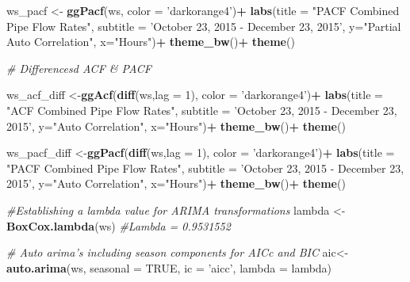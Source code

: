 \documentclass[openany]{book}
\newenvironment{Shaded}{\begin{snugshade}}{\end{snugshade}}
\newcommand{\CommentTok}[1]{\textcolor[rgb]{0.56,0.35,0.01}{\textit{#1}}}
\newcommand{\DataTypeTok}[1]{\textcolor[rgb]{0.13,0.29,0.53}{#1}}
\newcommand{\DecValTok}[1]{\textcolor[rgb]{0.00,0.00,0.81}{#1}}
\newcommand{\KeywordTok}[1]{\textcolor[rgb]{0.13,0.29,0.53}{\textbf{#1}}}
\newcommand{\NormalTok}[1]{#1}
\newcommand{\OperatorTok}[1]{\textcolor[rgb]{0.81,0.36,0.00}{\textbf{#1}}}
\newcommand{\OtherTok}[1]{\textcolor[rgb]{0.56,0.35,0.01}{#1}}
\newcommand{\StringTok}[1]{\textcolor[rgb]{0.31,0.60,0.02}{#1}}
\begin{document}
\begin{Shaded}
\begin{Highlighting}[]
{{{{{{{{{{{\NormalTok{ws_pacf <-}\StringTok{ }\KeywordTok{ggPacf}\NormalTok{(ws, }\DataTypeTok{color =} \StringTok{'darkorange4'}\NormalTok{)}\OperatorTok{+}
\StringTok{    }\KeywordTok{labs}\NormalTok{(}\DataTypeTok{title =} \StringTok{"PACF Combined Pipe Flow Rates"}\NormalTok{, }
         \DataTypeTok{subtitle =} \StringTok{'October 23, 2015 - December 23, 2015'}\NormalTok{,}
         \DataTypeTok{y=}\StringTok{"Partial Auto Correlation"}\NormalTok{, }\DataTypeTok{x=}\StringTok{"Hours"}\NormalTok{)}\OperatorTok{+}
\StringTok{    }\KeywordTok{theme_bw}\NormalTok{()}\OperatorTok{+}\StringTok{ }\KeywordTok{theme}\NormalTok{()}

\CommentTok{# Differencesd ACF & PACF}

\NormalTok{ws_acf_diff <-}\KeywordTok{ggAcf}\NormalTok{(}\KeywordTok{diff}\NormalTok{(ws,}\DataTypeTok{lag =} \DecValTok{1}\NormalTok{), }\DataTypeTok{color =} \StringTok{'darkorange4'}\NormalTok{)}\OperatorTok{+}
\StringTok{    }\KeywordTok{labs}\NormalTok{(}\DataTypeTok{title =} \StringTok{"ACF Combined Pipe Flow Rates"}\NormalTok{, }
         \DataTypeTok{subtitle =} \StringTok{'October 23, 2015 - December 23, 2015'}\NormalTok{,}
         \DataTypeTok{y=}\StringTok{"Auto Correlation"}\NormalTok{, }\DataTypeTok{x=}\StringTok{"Hours"}\NormalTok{)}\OperatorTok{+}
\StringTok{    }\KeywordTok{theme_bw}\NormalTok{()}\OperatorTok{+}\StringTok{ }\KeywordTok{theme}\NormalTok{()}

\NormalTok{ws_pacf_diff <-}\KeywordTok{ggPacf}\NormalTok{(}\KeywordTok{diff}\NormalTok{(ws,}\DataTypeTok{lag =} \DecValTok{1}\NormalTok{), }\DataTypeTok{color =} \StringTok{'darkorange4'}\NormalTok{)}\OperatorTok{+}
\StringTok{    }\KeywordTok{labs}\NormalTok{(}\DataTypeTok{title =} \StringTok{"PACF Combined Pipe Flow Rates"}\NormalTok{, }
         \DataTypeTok{subtitle =} \StringTok{'October 23, 2015 - December 23, 2015'}\NormalTok{,}
         \DataTypeTok{y=}\StringTok{"Auto Correlation"}\NormalTok{, }\DataTypeTok{x=}\StringTok{"Hours"}\NormalTok{)}\OperatorTok{+}
\StringTok{    }\KeywordTok{theme_bw}\NormalTok{()}\OperatorTok{+}\StringTok{ }\KeywordTok{theme}\NormalTok{()}

\CommentTok{#Establishing a lambda value for ARIMA transformations}
\NormalTok{lambda <-}\StringTok{  }\KeywordTok{BoxCox.lambda}\NormalTok{(ws)}
\CommentTok{#Lambda = 0.9531552}


\CommentTok{# Auto arima's including season components for AICc and BIC}
\NormalTok{aic<-}\StringTok{ }\KeywordTok{auto.arima}\NormalTok{(ws, }\DataTypeTok{seasonal =} \OtherTok{TRUE}\NormalTok{, }\DataTypeTok{ic =} \StringTok{'aicc'}\NormalTok{, }\DataTypeTok{lambda =}\NormalTok{ lambda)}

}}}}}}}}}}}
\end{Highlighting}
\end{Shaded}
\end{document}
